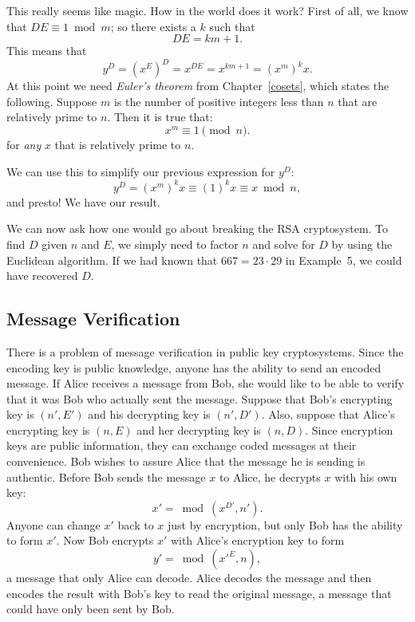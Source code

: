  
\vspace{ 2 ex}
 
 
This really seems like magic. How in the world does it work? 
First of all, we know that $DE
\equiv 1 \bmod{ m}$; so there exists a $k$ such that 
$$
DE = km + 1.
$$
This means that
$$
y^D = (x^E)^D = x^{DE} = x^{km+1} = (x^m)^k x.
$$
At this point we need \emph{Euler's theorem} from Chapter~\ref{cosets}, which states the following. Suppose $m$ is the number of positive integers less than $n$ that are relatively prime to $n$. Then it is true that:
$$
x^m \equiv 1 \pmod n.
$$
for \emph{any} $x$ that is relatively prime to $n$. 

We can use this to simplify our previous expression for $y^D$:
$$
y^D =  (x^m)^k x \equiv (1)^k x  \equiv x \bmod n,
$$
 and presto! We have our result.
 
We can now ask how one would go about breaking the RSA cryptosystem.
To find $D$ given $n$ and $E$, we simply need to factor $n$ and solve
for $D$ by using the Euclidean algorithm. If we had known that $667 =
23 \cdot 29$ in Example~5, we could have recovered $D$.    
 
 
 
\subsection*{Message Verification}
 
 
There is a problem of message verification in public key
cryptosystems. Since the encoding key is public knowledge, anyone has
the ability to send an encoded message.  If Alice receives a message
from Bob, she would like to be able to verify that it was Bob who
actually sent the message. Suppose that Bob's encrypting key is $(n',
E')$ and his decrypting key is $(n', D')$.  Also, suppose that Alice's
encrypting key is $(n, E)$ and her decrypting key is $(n, D)$.  Since
encryption keys are public information, they can exchange coded
messages at their convenience.  Bob wishes to assure Alice that the
message he is sending is authentic. Before Bob sends the message $x$
to Alice, he decrypts  $x$ with his own key:
$$
x' =  \bmod(x ^{D'}, n').
$$
Anyone can change $x'$ back to $x$ just by encryption, but only Bob
has the ability to form $x'$. Now Bob encrypts $x'$ with Alice's
encryption key to form 
$$
y' = \bmod({x'}^E,   n),
$$
a message that only Alice can decode.  Alice decodes the message and
then encodes the result with Bob's key to read the original message, a
message that could have only been sent by Bob.
 
